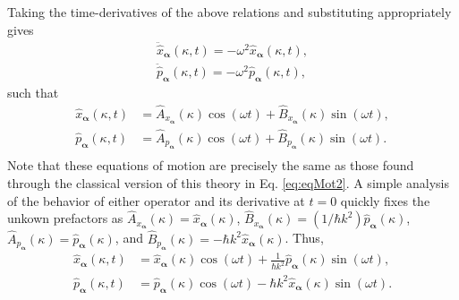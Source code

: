 \documentclass{article}
\numberwithin{equation}{section}
\begin{document}
Taking the time-derivatives of the above relations and substituting appropriately gives
\begin{equation}
\begin{split}
\ddot{\hat{x}}_{\bm{\alpha}}(\kappa,t) = -\omega^2\hat{x}_{\bm{\alpha}}(\kappa,t),\\
\ddot{\hat{p}}_{\bm{\alpha}}(\kappa,t) = -\omega^2\hat{p}_{\bm{\alpha}}(\kappa,t),
\end{split}
\end{equation}
such that
\begin{equation}
\begin{split}
\hat{x}_{\bm{\alpha}}(\kappa,t) &= \hat{A}_{x_{\bm{\alpha}}}(\kappa)\cos(\omega t) + \hat{B}_{x_{\bm{\alpha}}}(\kappa)\sin(\omega t),\\
\hat{p}_{\bm{\alpha}}(\kappa,t) &= \hat{A}_{p_{\bm{\alpha}}}(\kappa)\cos(\omega t) + \hat{B}_{p_{\bm{\alpha}}}(\kappa)\sin(\omega t).\\
\end{split}
\end{equation}
Note that these equations of motion are precisely the same as those found through the classical version of this theory in Eq. \eqref{eq:eqMot2}. A simple analysis of the behavior of either operator and its derivative at $t = 0$ quickly fixes the unkown prefactors as $\hat{A}_{x_{\bm{\alpha}}}(\kappa) = \hat{x}_{\bm{\alpha}}(\kappa)$, $\hat{B}_{x_{\bm{\alpha}}}(\kappa) = (1/\hbar k^2)\hat{p}_{\bm{\alpha}}(\kappa)$, $\hat{A}_{p_{\bm{\alpha}}}(\kappa) = \hat{p}_{\bm{\alpha}}(\kappa)$, and $\hat{B}_{p_{\bm{\alpha}}}(\kappa) = -\hbar k^2\hat{x}_{\bm{\alpha}}(\kappa)$. Thus,
\begin{equation}
\begin{split}
\hat{x}_{\bm{\alpha}}(\kappa,t) &= \hat{x}_{\bm{\alpha}}(\kappa)\cos(\omega t) + \frac{1}{\hbar k^2}\hat{p}_{\bm{\alpha}}(\kappa)\sin(\omega t),\\
\hat{p}_{\bm{\alpha}}(\kappa,t) &= \hat{p}_{\bm{\alpha}}(\kappa)\cos(\omega t) - \hbar k^2\hat{x}_{\bm{\alpha}}(\kappa)\sin(\omega t).\\
\end{split}
\end{equation}
\end{document}
